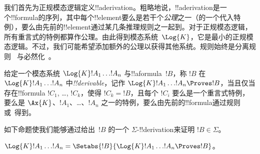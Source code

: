 \documentclass[../../../include/open-logic-section]{subfiles}
\begin{document}


我们首先为正规模态逻辑定义!!a{derivation}。粗略地说，!!a{derivation}是一个!!{formula}的序列，其中每个!!{element}要么是若干个\emph{公理}之一（的一个代入特例），要么由先前的!!{element}通过某几条推理规则之一起到。对于正规模态逻辑，所有重言式的特例都算作公理。由此得到模态系统~$\Log{K}$，它是最小的正规模态逻辑。不过，我们可能希望添加额外的公理以获得其他系统。规则始终是分离规则~\MP{} 与必然化~\Nec。

\begin{defn}
  给定一个模态系统 $\Log{K} !A_1 \dots !A_n$ 与!!a{formula}~$!B$，称 $!B$ 在 $\Log{K} !A_1 \dots
  !A_n$ 中\emph{!!{derivable}}，记作 $\Log{K} !A_1 \dots !A_n \Proves !B$，当且仅当存在!!{formula} $!C_1$, \dots, $!C_k$，使得 $!C_k = !B$，且每个 $!C_i$ 要么是一个重言式特例，要么是 $\Ax{K}$、$!A_1$、\dots、$!A_n$ 之一的特例，要么由先前的!!{formula}通过规则 \MP{} 或~\Nec 得到。
\end{defn}

如下命题使我们能够通过给出~$!B$ 的一个 $\Sigma$-!!{derivation}来证明 $!B \in \Sigma$。

\begin{prop}
  $\Log{K} !A_1 \dots !A_n = \Setabs{!B}{\Log{K} !A_1 \dots !A_n \Proves !B}$。
\end{prop}
\end{document}
